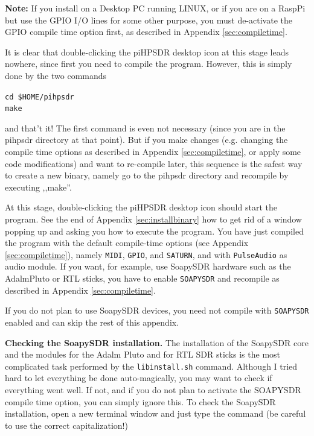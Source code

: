 \documentclass[12pt]{book}
\def\grtt#1{\texttt{\color{magenta}#1}}
\begin{document}
\textbf{Note:} If you install on a Desktop PC running LINUX, or if you are on a RaspPi but use
the GPIO I/O lines for some other purpose, you must de-activate the GPIO compile time option
first, as described in Appendix \ref{sec:compiletime}.

It is clear that double-clicking the piHPSDR desktop icon at this stage leads nowhere,
since first you need to compile the program.
However,
this is simply done by the two commands

\grtt{cd \$HOME/pihpsdr} \\
\grtt{make}

and that't it! The first command is even not necessary (since you are in the pihpsdr
directory at that point).
But if you make changes (e.g. changing the compile time options as described in
Appendix \ref{sec:compiletime}, or apply some code modifications)
and want to re-compile later, this sequence is the safest way to create a new binary,
namely go to the pihpsdr
directory and recompile by executing ,,make''.

At this stage, double-clicking the piHPSDR desktop icon should start the program. See
the end of Appendix \ref{sec:installbinary} how to get rid of a window popping up
and asking you how to execute the program. You have just compiled the program with 
the default compile-time options (see Appendix \ref{sec:compiletime}), namely
\texttt{MIDI}, \texttt{GPIO}, and \texttt{SATURN}, and with \texttt{PulseAudio}
as audio module. If you want, for example, use SoapySDR hardware such as the AdalmPluto
or RTL sticks, you have to enable \texttt{SOAPYSDR} and recompile as described in
Appendix \ref{sec:compiletime}.

If you do not plan to use SoapySDR devices, you need not compile with \texttt{SOAPYSDR}
enabled and can skip the rest of this appendix.

\textbf{Checking the SoapySDR installation.}
The installation of the SoapySDR core and the modules for the Adalm Pluto and for RTL SDR
sticks is the most complicated task performed by the \texttt{libinstall.sh} command.
Although I tried hard to let everything be done auto-magically, you may want to check
if everything went well. If not, and if you do not plan to activate the SOAPYSDR compile time
option, you can simply ignore this. To check the SoapySDR installation, open a new terminal
window and just type the command (be careful to use the correct capitalization!)
\end{document}
